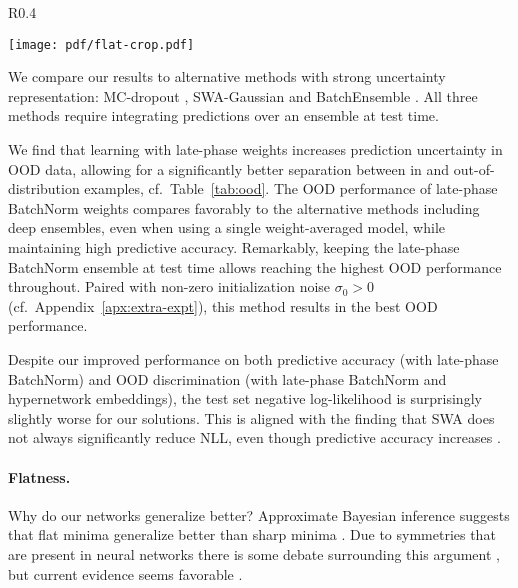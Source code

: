 \documentclass{article} \usepackage{iclr2021_conference,times}
\begin{document}
\begin{wrapfigure}[13]{R}{0.4\textwidth}
  \vspace{-19pt}
  \begin{center}
    \texttt{[image: pdf/flat-crop.pdf]}
  \end{center}
  \vspace{-14pt}
\end{wrapfigure}
We compare our results to alternative methods with strong uncertainty representation: MC-dropout \citep{gal_dropout_2016}, SWA-Gaussian \citep[SWAG;][]{maddox_simple_2019} and BatchEnsemble \citep{wen_batchensemble_2020}. All three methods require integrating predictions over an ensemble at test time.

We find that learning with late-phase weights increases prediction uncertainty in OOD data, allowing for a significantly better separation between in and out-of-distribution examples, cf.~Table~\ref{tab:ood}. The OOD performance of late-phase BatchNorm weights compares favorably to the alternative methods including deep ensembles, even when using a single weight-averaged model, while maintaining high predictive accuracy. Remarkably, keeping the late-phase BatchNorm ensemble at test time allows reaching the highest OOD performance throughout. Paired with non-zero initialization noise $\sigma_0>0$ (cf.~Appendix~\ref{apx:extra-expt}), this method results in the best OOD performance.

Despite our improved performance on both predictive accuracy (with late-phase BatchNorm) and OOD discrimination (with late-phase BatchNorm and hypernetwork embeddings), the test set negative log-likelihood \citep[NLL; often used to assess predictive uncertainty,][]{guo_calibration_2017} is surprisingly slightly worse for our solutions. This is aligned with the finding that SWA does not always significantly reduce NLL, even though predictive accuracy increases \citep{maddox_simple_2019}.



\paragraph{Flatness.} Why do our networks generalize better? Approximate Bayesian inference suggests that flat minima generalize better than sharp minima \citep{hochreiter_flat_1997,mackay_practical_1992}. Due to symmetries that are present in neural networks there is some debate surrounding this argument \citep{dinh_sharp_2017}, but current evidence seems favorable \citep[][]{jiang_fantastic_2020}.
\end{document}
